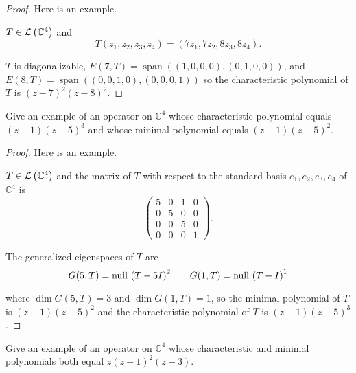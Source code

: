 \begin{proof}
    Here is an example.

    $T\in\mathcal{L}\left({\mathbb{C}^{4}}\right)$ and
    \[
        T(z_{1}, z_{2}, z_{3}, z_{4}) = (7z_{1}, 7z_{2}, 8z_{3}, 8z_{4}).
    \]

    $T$ is diagonalizable, $E(7, T) = \operatorname{span}((1, 0, 0, 0), (0, 1, 0, 0))$, and $E(8, T) = \operatorname{span}((0, 0, 1, 0), (0, 0, 0, 1))$ so the characteristic polynomial of $T$ is ${(z-7)}^{2}{(z-8)}^{2}$.
\end{proof}
\newpage

\begin{exercise}\label{chapter8:sectionB:exercise12}
    Give an example of an operator on $\mathbb{C}^{4}$ whose characteristic polynomial equals $(z - 1){(z - 5)}^{3}$ and whose minimal polynomial equals $(z - 1){(z - 5)}^{2}$.
\end{exercise}

\begin{proof}
    Here is an example.

    $T\in\mathcal{L}\left({\mathbb{C}^{4}}\right)$ and the matrix of $T$ with respect to the standard basis $e_{1}, e_{2}, e_{3}, e_{4}$ of $\mathbb{C}^{4}$ is
    \[
        \begin{pmatrix}
            5 & 0 & 1 & 0 \\
            0 & 5 & 0 & 0 \\
            0 & 0 & 5 & 0 \\
            0 & 0 & 0 & 1
        \end{pmatrix}.
    \]

    The generalized eigenspaces of $T$ are
    \[
        G(5, T) = \operatorname{null}\,{{(T - 5I)}^{2}}\qquad G(1, T) = \operatorname{null}\,{{(T - I)}^{1}}
    \]

    where $\dim G(5, T) = 3$ and $\dim G(1, T) = 1$, so the minimal polynomial of $T$ is $(z-1){(z-5)}^{2}$ and the characteristic polynomial of $T$ is $(z-1){(z-5)}^{3}$.
\end{proof}
\newpage

\begin{exercise}\label{chapter8:sectionB:exercise13}
    Give an example of an operator on $\mathbb{C}^{4}$ whose characteristic and minimal polynomials both equal $z{(z - 1)}^{2}(z - 3)$.
\end{exercise}


